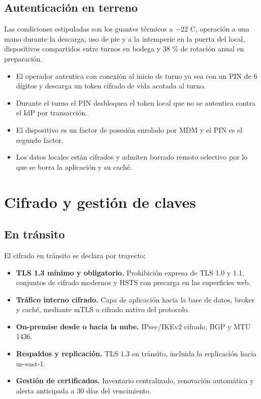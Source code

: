 \subsection{Autenticación en terreno}

Las condiciones estipuladas son los guantes térmicos a $-$22 \textdegree{}C, operación a una mano durante la descarga, uso de pie y a la intemperie en la puerta del local, dispositivos compartidos entre turnos en bodega y 38 \% de rotación anual en preparación.

\begin{itemize}
  \item El operador autentica con conexión al inicio de turno ya sea con un PIN de 6 dígitos y descarga un token cifrado de vida acotada al turno.
  \item Durante el turno el PIN desbloquea el token local que no se autentica contra el IdP por transacción.
  \item El dispositivo es un factor de posesión enrolado por MDM y el PIN es el segundo factor.
  \item Los datos locales están cifrados y admiten borrado remoto selectivo por lo que se borra la aplicación y su caché.
\end{itemize}

\section{Cifrado y gestión de claves}
\label{sub:5-cifrado-y-gestion-de-claves-art-21-2-rt-}

\subsection{En tránsito}

El cifrado en tránsito se declara por trayecto:

\begin{itemize}
  \item \textbf{TLS 1.3 mínimo y obligatorio.} Prohibición expresa de TLS 1.0 y 1.1, conjuntos de cifrado modernos y HSTS con precarga en las superficies web.
  \item \textbf{Tráfico interno cifrado.} Capa de aplicación hacia la base de datos, broker y caché, mediante mTLS o cifrado nativo del protocolo.
  \item \textbf{On-premise desde o hacia la nube.} IPsec/IKEv2 cifrado, BGP y MTU 1436.
  \item \textbf{Respaldos y replicación.} TLS 1.3 en tránsito, incluida la replicación hacia us-east-1.
  \item \textbf{Gestión de certificados.} Inventario centralizado, renovación automática y alerta anticipada a 30 días del vencimiento.
\end{itemize}

